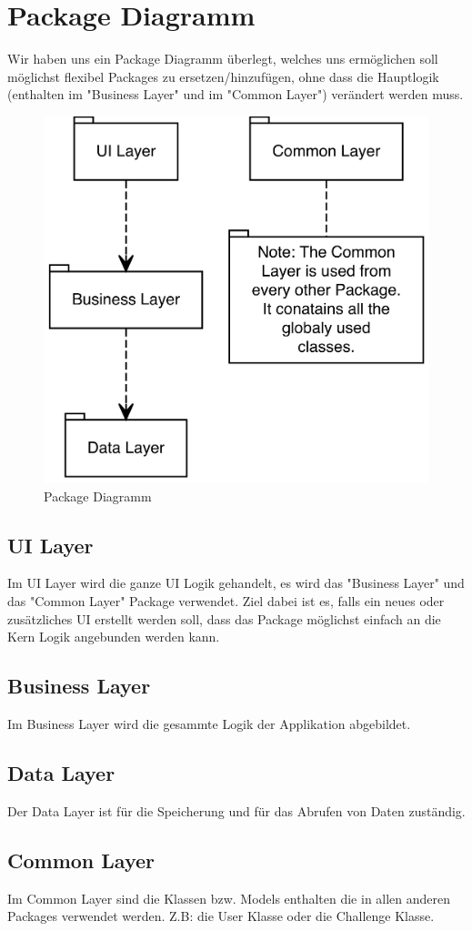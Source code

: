 \chapter{Package Diagramm}
Wir haben uns ein Package Diagramm überlegt, welches uns ermöglichen soll möglichst flexibel Packages zu ersetzen/hinzufügen, ohne dass die Hauptlogik (enthalten im "Business Layer" und im "Common Layer") verändert werden muss.
\begin{figure}[H]
\centering
\includegraphics[width=1\textwidth]{../PackageDiagramm/PackageDiagramm.png}
\caption{Package Diagramm}
\end{figure}

\section{UI Layer}
Im UI Layer wird die ganze UI Logik gehandelt, es wird das "Business Layer" und das "Common Layer" Package verwendet. Ziel dabei ist es, falls ein neues oder zusätzliches UI erstellt werden soll, dass das Package möglichst einfach an die Kern Logik angebunden werden kann.

\section{Business Layer}
Im Business Layer wird die gesammte Logik der Applikation abgebildet.

\section{Data Layer}
Der Data Layer ist für die Speicherung und für das Abrufen von Daten zuständig.

\section{Common Layer}
Im Common Layer sind die Klassen bzw. Models enthalten die in allen anderen Packages verwendet werden. Z.B: die User Klasse oder die Challenge Klasse.

